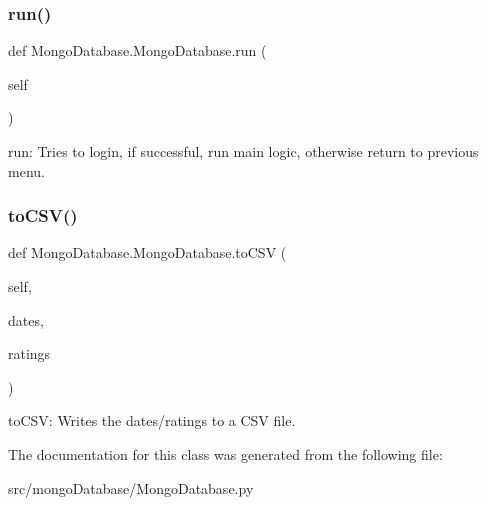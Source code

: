 \subsubsection{\texorpdfstring{run()}{run()}}
{\footnotesize\ttfamily def Mongo\+Database.\+Mongo\+Database.\+run (\begin{DoxyParamCaption}\item[{}]{self }\end{DoxyParamCaption})}

\begin{DoxyVerb}run: Tries to login, if successful, run main logic, otherwise
    return to previous menu. \end{DoxyVerb}
 \hypertarget{class_mongo_database_1_1_mongo_database_a27e20258620a2a1953a460e7c7aa3e14}{}\label{class_mongo_database_1_1_mongo_database_a27e20258620a2a1953a460e7c7aa3e14} 
\subsubsection{\texorpdfstring{to\+C\+S\+V()}{toCSV()}}
{\footnotesize\ttfamily def Mongo\+Database.\+Mongo\+Database.\+to\+C\+SV (\begin{DoxyParamCaption}\item[{}]{self,  }\item[{}]{dates,  }\item[{}]{ratings }\end{DoxyParamCaption})}

\begin{DoxyVerb}toCSV: Writes the dates/ratings to a CSV file. \end{DoxyVerb}
 

The documentation for this class was generated from the following file\+:\begin{DoxyCompactItemize}
\item 
src/mongo\+Database/Mongo\+Database.\+py\end{DoxyCompactItemize}
